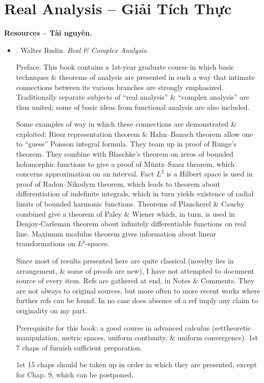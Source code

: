 \documentclass{article}
\begin{document}
\section{Real Analysis -- Giải Tích Thực}
\textbf{\textsf{Resources -- Tài nguyên.}}
\begin{itemize}
	\item \cite{Rudin1987}. {\sc Walter Rudin}. {\it Real \& Complex Analysis}.
	
	{\sf Preface.} This book contains a 1st-year graduate course in which basic techniques \& theorems of analysis are presented in such a way that intimate connections between its various branches are strongly emphasized. Traditionally separate subjects of ``real analysis'' \& ``complex analysis'' are thus united; some of basic ideas from functional analysis are also included.
	
	Some examples of way in which these connections are demonstrated \& exploited: Riesz representation theorem \& Hahn--Banach theorem allow one to ``guess'' Poisson integral formula. They team up in proof of Runge's theorem. They combine with Blaschke's theorem on zeros of bounded holomorphic functions to give a proof of M\"untz--Szasz theorem, which concerns approximation on an interval. Fact $L^2$ is a Hilbert space is used in proof of Radon--Nikodym theorem, which leads to theorem about differentiation of indefinite integrals, which in turn yields existence of radial limits of bounded harmonic functions. Theorems of Plancherel \& Cauchy combined give a theorem of Paley \& Wiener which, in turn, is used in Denjoy-Carleman theorem about infinitely differentiable functions on real line. Maximum modulus theorem gives information about linear transformations on $L^p$-spaces.
	
	Since most of results presented here are quite classical (novelty lies in arrangement, \& some of proofs are new), I have not attempted to document source of every item. Refs are gathered at end, in Notes \& Comments. They are not always to original sources, but more often to more recent works where further refs can be found. In no case does absence of a ref imply any claim to originality on my part.
	
	Prerequisite for this book: a good course in advanced calculus (settheoretic manipulation, metric spaces, uniform continuity, \& uniform convergence). 1st 7 chaps of \cite{Rudin1973,Rudin1976} furnish sufficient preparation.
	
	1st 15 chaps should be taken up in order in which they are presented, except for Chap. 9, which can be postponed.
	

\end{itemize}
\end{document}
